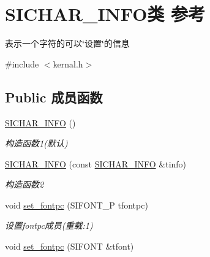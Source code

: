 \hypertarget{class_s_i_c_h_a_r___i_n_f_o}{}\section{S\+I\+C\+H\+A\+R\+\_\+\+I\+N\+F\+O类 参考}
\label{class_s_i_c_h_a_r___i_n_f_o}


表示一个字符的可以\char`\"{}设置\char`\"{}的信息  




{\ttfamily \#include $<$kernal.\+h$>$}

\subsection*{Public 成员函数}
\begin{DoxyCompactItemize}
\item 
\mbox{\label{class_s_i_c_h_a_r___i_n_f_o_ab0626402d19f4f4993077f947eb1c3de}} 
\hyperlink{class_s_i_c_h_a_r___i_n_f_o_ab0626402d19f4f4993077f947eb1c3de}{S\+I\+C\+H\+A\+R\+\_\+\+I\+N\+FO} ()
\begin{DoxyCompactList}\small\item\em 构造函数1(默认)~\newline
\end{DoxyCompactList}\item 
\mbox{\label{class_s_i_c_h_a_r___i_n_f_o_a21b428740b8332500ae61f43b700d6b2}} 
\hyperlink{class_s_i_c_h_a_r___i_n_f_o_a21b428740b8332500ae61f43b700d6b2}{S\+I\+C\+H\+A\+R\+\_\+\+I\+N\+FO} (const \hyperlink{class_s_i_c_h_a_r___i_n_f_o}{S\+I\+C\+H\+A\+R\+\_\+\+I\+N\+FO} \&tinfo)
\begin{DoxyCompactList}\small\item\em 构造函数2~\newline
\end{DoxyCompactList}\item 
void \hyperlink{class_s_i_c_h_a_r___i_n_f_o_a7dd5af8833b1951a6e4759668d484f37}{set\+\_\+fontpc} (S\+I\+F\+O\+N\+T\+\_\+P tfontpc)
\begin{DoxyCompactList}\small\item\em 设置fontpc成员(重载\+:1) \end{DoxyCompactList}\item 
void \hyperlink{class_s_i_c_h_a_r___i_n_f_o_a01ad1057400db3ccec680de26f4ab0a2}{set\+\_\+fontpc} (S\+I\+F\+O\+NT \&tfont)

\end{DoxyCompactItemize}
